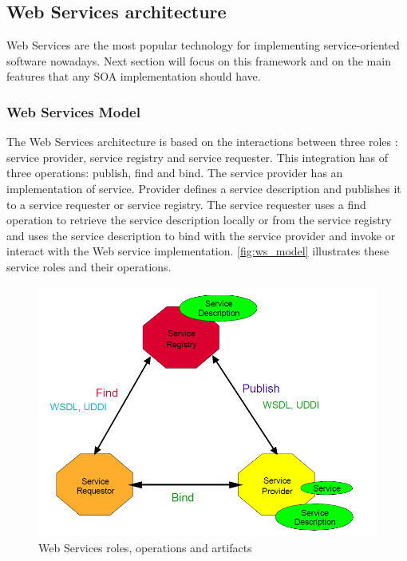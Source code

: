\subsection{Web Services architecture}
Web Services are the most popular technology for implementing
service-oriented software nowadays. 
Next section will focus on this framework
and on the main features that any SOA implementation should have.

\subsubsection{Web Services Model}
The Web Services architecture is based on the interactions between three
roles \cite{Kreger2001-WSC}:
service provider, service registry and service requester. 
This integration has of three operations: publish, find and
bind. The service provider has an implementation of service. Provider defines a
service description and publishes it to a service requester or service registry.
The service requester uses a find operation to retrieve the service
description locally or from the service registry and uses the service description to bind with the
service provider and invoke or interact with the Web service implementation.
\autoref{fig:ws_model} illustrates these service roles and their operations.


\begin{center}
 \begin{figure}[H]
	\includegraphics[width=\textwidth]{../images/background/ws_model.png}
	\caption{Web Services roles, operations and artifacts \cite{Kreger2001-WSC}}
	\label{fig:ws_model}
 \end{figure}
\end{center}

